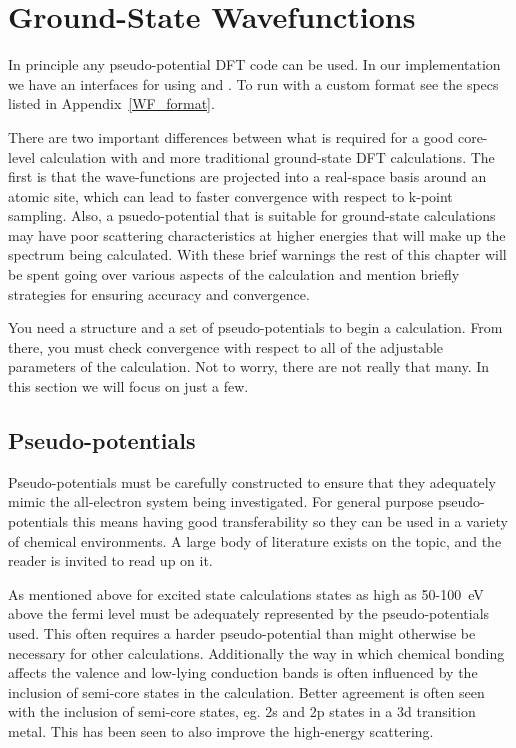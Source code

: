 \documentclass[11pt]{report}
\begin{document}
\chapter{Ground-State Wavefunctions}
\label{ground_state}
In principle any pseudo-potential DFT code can be used. In our implementation we have an interfaces for using 
\cite{abinit} and  \cite{quantumespresso}. 
To run with a custom format see the specs listed in Appendix~\ref{WF_format}.

There are two important differences between what is required for a good core-level calculation with  and more traditional ground-state DFT calculations. The first is that the wave-functions are projected into a real-space basis around an atomic site, which can lead to faster convergence with respect to k-point sampling. Also, a psuedo-potential that is suitable for ground-state calculations may have poor scattering characteristics at higher energies that will make up the spectrum being calculated. With these brief warnings the rest of this chapter will be spent going over various aspects of the calculation and mention briefly strategies for ensuring accuracy and convergence.

You need a structure and a set of pseudo-potentials to begin a calculation. From there, you must check convergence with respect to all of the adjustable parameters of the calculation. Not to worry, there are not really that many. In this section we will focus on just a few.

\section{Pseudo-potentials}

Pseudo-potentials must be carefully constructed to ensure that they adequately mimic the all-electron system being investigated. For general purpose pseudo-potentials this means having good transferability so they can be used in a variety of chemical environments. A large body of literature exists on the topic, and the reader is invited to read up on it.\cite{Psp} 

As mentioned above for excited state calculations states as high as 50-100~eV above the fermi level must be adequately represented by the pseudo-potentials used. This often requires a harder pseudo-potential than might otherwise be necessary for 
other calculations. Additionally the way in which chemical bonding affects the valence and low-lying conduction bands is often influenced by the inclusion of semi-core states in the calculation. Better agreement is often seen with the inclusion of semi-core states, eg. 2s and 2p states in a 3d transition metal. This has been seen to also improve the high-energy scattering.\cite{}
\end{document}
